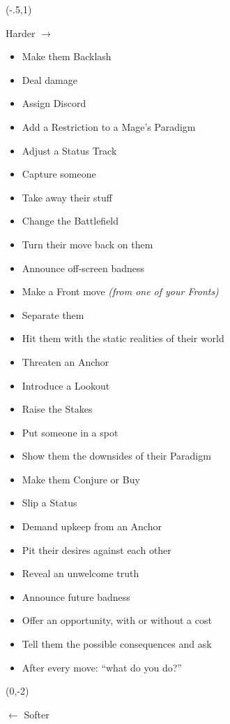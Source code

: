 \documentclass[letterpaper,10pt]{article}
\newcommand{\SECTION}[1]{\vspace{.5em}{\noindent\titlefont\LARGE\textbf{#1}}

}
\begin{document}
\begin{multicols}{2}
\SECTION{Your Moves}
\begin{textblock}{1}(-.5,1)
\begin{sideways}
\color{Gray}
{\large Harder $\rightarrow$}
\end{sideways}
\end{textblock}
\begin{itemize}
\item Make them Backlash
\item Deal damage
\item Assign Discord
\item Add a Restriction to a Mage’s Paradigm
\item Adjust a Status Track
\item Capture someone
\item Take away their stuff
\item Change the Battlefield
\bigskip
\item Turn their move back on them
\item Announce off-screen badness
\item Make a Front move \textit{(from one of your Fronts)}
\item Separate them
\item Hit them with the static realities of their world
\bigskip
\item Threaten an Anchor
\item Introduce a Lookout
\item Raise the Stakes
\item Put someone in a spot
\item Show them the downsides of their Paradigm
\item Make them Conjure or Buy
\item Slip a Status
\item Demand upkeep from an Anchor
\item Pit their desires against each other
\item Reveal an unwelcome truth
\item Announce future badness
\item Offer an opportunity, with or without a cost
\item Tell them the possible consequences and ask
\item After every move: ``what do you do?''
\end{itemize}
\begin{textblock}{1}(0,-2)
\begin{sideways}
\color{Gray}
{\large $\leftarrow$ Softer}
\end{sideways}
\end{textblock}
\columnbreak


\end{multicols}
\end{document}
